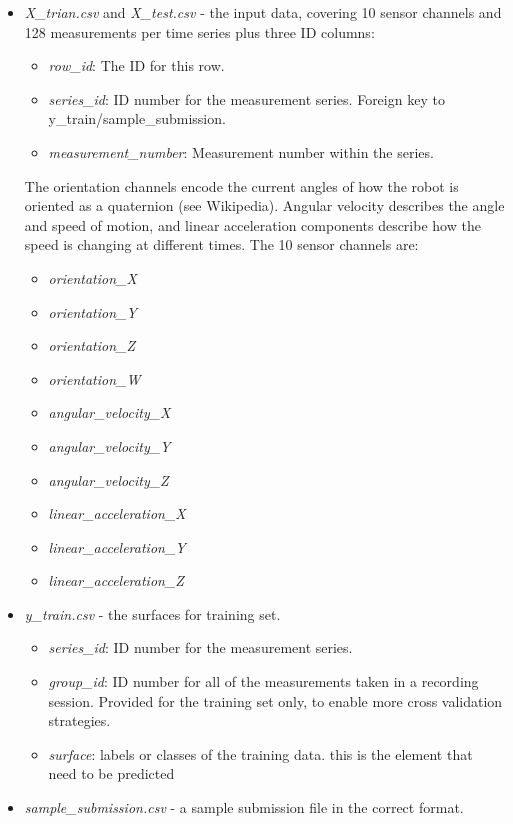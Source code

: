 \documentclass[]{article}
\providecommand{\tightlist}{%
  \setlength{\itemsep}{0pt}\setlength{\parskip}{0pt}}
\begin{document}
\begin{itemize}
\item
  \emph{X\_trian.csv} and \emph{X\_test.csv} - the input data, covering
  10 sensor channels and 128 measurements per time series plus three ID
  columns:

  \begin{itemize}
  \tightlist
  \item
    \emph{row\_id}: The ID for this row.
  \item
    \emph{series\_id}: ID number for the measurement series. Foreign key
    to y\_train/sample\_submission.
  \item
    \emph{measurement\_number}: Measurement number within the series.
  \end{itemize}

  The orientation channels encode the current angles of how the robot is
  oriented as a quaternion (see Wikipedia). Angular velocity describes
  the angle and speed of motion, and linear acceleration components
  describe how the speed is changing at different times. The 10 sensor
  channels are:

  \begin{itemize}
  \tightlist
  \item
    \emph{orientation\_X}
  \item
    \emph{orientation\_Y}
  \item
    \emph{orientation\_Z}
  \item
    \emph{orientation\_W}
  \item
    \emph{angular\_velocity\_X}
  \item
    \emph{angular\_velocity\_Y}
  \item
    \emph{angular\_velocity\_Z}
  \item
    \emph{linear\_acceleration\_X}
  \item
    \emph{linear\_acceleration\_Y}
  \item
    \emph{linear\_acceleration\_Z}
  \end{itemize}
\item
  \emph{y\_train.csv} - the surfaces for training set.

  \begin{itemize}
  \tightlist
  \item
    \emph{series\_id}: ID number for the measurement series.
  \item
    \emph{group\_id}: ID number for all of the measurements taken in a
    recording session. Provided for the training set only, to enable
    more cross validation strategies.
  \item
    \emph{surface}: labels or classes of the training data. this is the
    element that need to be predicted
  \end{itemize}
\item
  \emph{sample\_submission.csv} - a sample submission file in the
  correct format.
\end{itemize}
\end{document}
